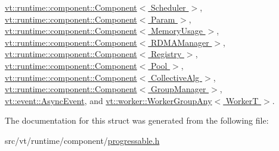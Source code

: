 \hyperlink{structvt_1_1runtime_1_1component_1_1_component_a1dab11d9eb5bed8dfd5a3bb8fdf67f5a}{vt\+::runtime\+::component\+::\+Component$<$ Scheduler $>$}, \hyperlink{structvt_1_1runtime_1_1component_1_1_component_a1dab11d9eb5bed8dfd5a3bb8fdf67f5a}{vt\+::runtime\+::component\+::\+Component$<$ Param $>$}, \hyperlink{structvt_1_1runtime_1_1component_1_1_component_a1dab11d9eb5bed8dfd5a3bb8fdf67f5a}{vt\+::runtime\+::component\+::\+Component$<$ Memory\+Usage $>$}, \hyperlink{structvt_1_1runtime_1_1component_1_1_component_a1dab11d9eb5bed8dfd5a3bb8fdf67f5a}{vt\+::runtime\+::component\+::\+Component$<$ R\+D\+M\+A\+Manager $>$}, \hyperlink{structvt_1_1runtime_1_1component_1_1_component_a1dab11d9eb5bed8dfd5a3bb8fdf67f5a}{vt\+::runtime\+::component\+::\+Component$<$ Registry $>$}, \hyperlink{structvt_1_1runtime_1_1component_1_1_component_a1dab11d9eb5bed8dfd5a3bb8fdf67f5a}{vt\+::runtime\+::component\+::\+Component$<$ Pool $>$}, \hyperlink{structvt_1_1runtime_1_1component_1_1_component_a1dab11d9eb5bed8dfd5a3bb8fdf67f5a}{vt\+::runtime\+::component\+::\+Component$<$ Collective\+Alg $>$}, \hyperlink{structvt_1_1runtime_1_1component_1_1_component_a1dab11d9eb5bed8dfd5a3bb8fdf67f5a}{vt\+::runtime\+::component\+::\+Component$<$ Group\+Manager $>$}, \hyperlink{structvt_1_1event_1_1_async_event_a36f18429bc2856a30c8f7fd70654e0a4}{vt\+::event\+::\+Async\+Event}, and \hyperlink{structvt_1_1worker_1_1_worker_group_any_a1a2d6dc321514501e00c0373f2583146}{vt\+::worker\+::\+Worker\+Group\+Any$<$ Worker\+T $>$}.



The documentation for this struct was generated from the following file\+:\begin{DoxyCompactItemize}
\item 
src/vt/runtime/component/\hyperlink{progressable_8h}{progressable.\+h}\end{DoxyCompactItemize}
